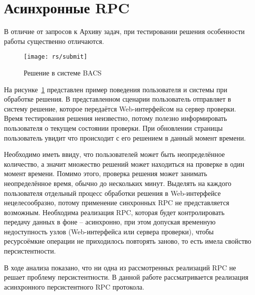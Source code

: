 \section{Асинхронные RPC}
В отличие от запросов к Архиву задач, при тестировании решения особенности
работы существенно отличаются.

\begin{figure}[H]
    \centering
    \texttt{[image: rs/submit]}
    \caption{Решение в системе BACS}
    \label{fig:submit}
\end{figure}

На рисунке~\ref{fig:submit} представлен пример поведения пользователя
и системы при обработке решения. В представленном сценарии пользователь
отправляет в систему решение, которое передаётся Web-интерфейсом
на сервер проверки. Время тестирования решения неизвестно, потому
полезно информировать пользователя о текущем состоянии проверки.
При обновлении страницы пользователь увидит что происходит с его
решением в данный момент времени.

Необходимо иметь ввиду, что пользователей может быть неопределённое количество,
а значит множество решений может находиться на проверке в один момент времени.
Помимо этого, проверка решения может занимать неопределённое время,
обычно до нескольких минут. Выделять на каждого пользователя отдельный
процесс обработки решения в Web-интерфейсе нецелесообразно,
потому применение синхронных RPC не представляется возможным.
Необходима реализация RPC, которая будет контролировать передачу данных
в фоне -- асинхронно, при этом допуская временную недоступность узлов
(Web-интерфейса или сервера проверки), чтобы ресурсоёмкие операции
не приходилось повторять заново, то есть имела свойство персистентности.

В ходе анализа показано, что ни одна из рассмотренных реализаций RPC
не решает проблему персистентности. В данной работе рассматривается
реализация асинхронного персистентного RPC протокола.
